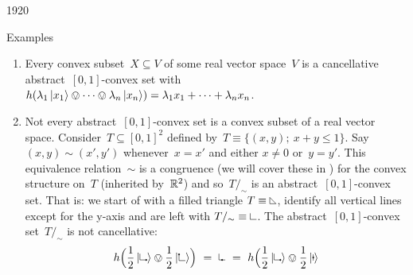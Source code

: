 \begin{parsec}{1920}
\begin{point}{50}{Examples}
\begin{enumerate}
\item
Every convex subset~$X \subseteq V$
    of some real vector space~$V$
    is a cancellative abstract~$[0,1]$-convex set
    with~$h(\lambda_1 \ket{x_1} \ovee \cdots \ovee \lambda_n \ket{x_n})
            = \lambda_1 x_1 + \cdots + \lambda_n x_n$.
\item
Not every abstract~$[0,1]$-convex set is
    a convex subset of a real vector space.
Consider~$T \subseteq [0,1]^2$
    defined by~$T \equiv \{ (x,y);\ x+y \leq 1\}$.
Say~$(x,y) \sim (x',y')$
    whenever~$x = x'$ and either $x\neq 0$ or~$y=y'$.
This equivalence relation~$\sim$
is a congruence (we will cover these in )
        for the convex structure on~$T$
    (inherited by~$\mathbb{R}^2$)
    and so~$T /_\sim$ is an abstract~$[0,1]$-convex set.
That is: we start of with a filled triangle
$T \equiv \begin{tikzpicture}[scale=0.2]
    \draw (0,0) -- (0,1) ; 
    \draw (1,0) -- (0,0) ; 
    \draw (1,0) -- (0,1) ; 
\end{tikzpicture}$,
identify all vertical lines
except for the y-axis
and are left with
$T/_\sim \equiv
\begin{tikzpicture}[scale=0.2]
    \draw (0,0) -- (0,1) ; 
    \draw (1,0) -- (0,0) ; 
\end{tikzpicture}$.
The abstract~$[0,1]$-convex set~$T/_\sim$
    is not cancellative:
\begin{equation*}
    h\Bigl( 
    \frac{1}{2}\ket{\begin{tikzpicture}[scale=0.2]
    \filldraw( 1,0) circle (3pt);
    \draw (0,0) -- (0,1) ; 
    \draw (1,0) -- (0,0) ; 
\end{tikzpicture}}
\ovee
    \frac{1}{2}\ket{\begin{tikzpicture}[scale=0.2]
    \filldraw( 0,1) circle (3pt);
    \draw (0,0) -- (0,1) ; 
    \draw (1,0) -- (0,0) ; 
\end{tikzpicture}} \Bigr)
\ = \
    \begin{tikzpicture}[scale=0.2]
    \filldraw( .5,0) circle (3pt);
    \draw (0,0) -- (0,1) ; 
    \draw (1,0) -- (0,0) ; 
\end{tikzpicture}
\ = \ 
h \Bigl(\frac{1}{2}\ket{\begin{tikzpicture}[scale=0.2]
    \filldraw( 1,0) circle (3pt);
    \draw (0,0) -- (0,1) ; 
    \draw (1,0) -- (0,0) ; 
\end{tikzpicture}}
\ovee
    \frac{1}{2}\ket{
        \begin{tikzpicture}[scale=0.2]
    \filldraw( 0,.5) circle (3pt);
    \draw (0,0) -- (0,1) ; 

\end{tikzpicture}}
\end{equation*}
\end{enumerate}
\end{point}
\end{parsec}
